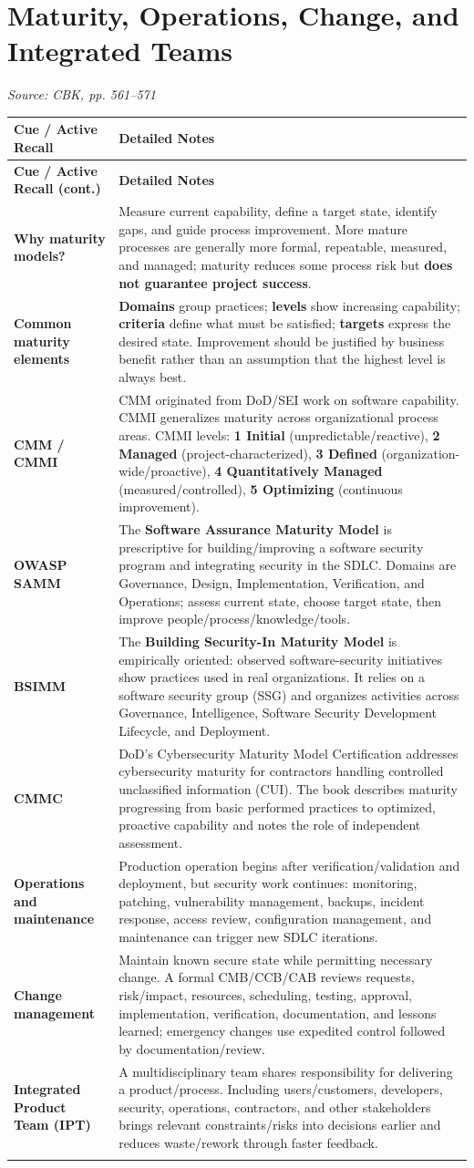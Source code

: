 \documentclass[10pt,letterpaper]{article}
\makeatletter
\newenvironment{cornell}{\rowcolors{2}{white}{notebg}\begin{longtable}{@{}>{\raggedright\arraybackslash\columncolor{cuebg}\color{navy}\bfseries}p{0.285\textwidth}>{\raggedright\arraybackslash}p{0.65\textwidth}@{}}\rowcolor{navy}\color{white}\textbf{Cue / Active Recall} & \color{white}\textbf{Detailed Notes}\\ \hline\endfirsthead\rowcolor{navy}\color{white}\textbf{Cue / Active Recall (cont.)} & \color{white}\textbf{Detailed Notes}\\ \hline\endhead}{\end{longtable}}
\newcommand{\noterow}[2]{#1 & #2\\\arrayrulecolor{line}\hline}\newcommand{\source}[1]{\par{\footnotesize\color{teal}\textit{Source: CBK, #1}}\par}
\makeatother
\begin{document}
\section{\color{navy}Maturity, Operations, Change, and Integrated Teams}
\source{pp. 561--571}
\begin{cornell}
\noterow{Why maturity models?}{Measure current capability, define a target state, identify gaps, and guide process improvement. More mature processes are generally more formal, repeatable, measured, and managed; maturity reduces some process risk but \textbf{does not guarantee project success}.}
\noterow{Common maturity elements}{\textbf{Domains} group practices; \textbf{levels} show increasing capability; \textbf{criteria} define what must be satisfied; \textbf{targets} express the desired state. Improvement should be justified by business benefit rather than an assumption that the highest level is always best.}
\noterow{CMM / CMMI}{CMM originated from DoD/SEI work on software capability. CMMI generalizes maturity across organizational process areas. CMMI levels: \textbf{1 Initial} (unpredictable/reactive), \textbf{2 Managed} (project-characterized), \textbf{3 Defined} (organization-wide/proactive), \textbf{4 Quantitatively Managed} (measured/controlled), \textbf{5 Optimizing} (continuous improvement).}
\noterow{OWASP SAMM}{The \textbf{Software Assurance Maturity Model} is prescriptive for building/improving a software security program and integrating security in the SDLC. Domains are Governance, Design, Implementation, Verification, and Operations; assess current state, choose target state, then improve people/process/knowledge/tools.}
\noterow{BSIMM}{The \textbf{Building Security-In Maturity Model} is empirically oriented: observed software-security initiatives show practices used in real organizations. It relies on a software security group (SSG) and organizes activities across Governance, Intelligence, Software Security Development Lifecycle, and Deployment.}
\noterow{CMMC}{DoD's Cybersecurity Maturity Model Certification addresses cybersecurity maturity for contractors handling controlled unclassified information (CUI). The book describes maturity progressing from basic performed practices to optimized, proactive capability and notes the role of independent assessment.}
\noterow{Operations and maintenance}{Production operation begins after verification/validation and deployment, but security work continues: monitoring, patching, vulnerability management, backups, incident response, access review, configuration management, and maintenance can trigger new SDLC iterations.}
\noterow{Change management}{Maintain known secure state while permitting necessary change. A formal CMB/CCB/CAB reviews requests, risk/impact, resources, scheduling, testing, approval, implementation, verification, documentation, and lessons learned; emergency changes use expedited control followed by documentation/review.}
\noterow{Integrated Product Team (IPT)}{A multidisciplinary team shares responsibility for delivering a product/process. Including users/customers, developers, security, operations, contractors, and other stakeholders brings relevant constraints/risks into decisions earlier and reduces waste/rework through faster feedback.}
\end{cornell}
\end{document}
